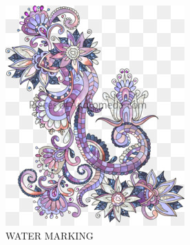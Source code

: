 \documentclass[12pt]{IEEEtran}
\begin{document}
\begin{subfigure}{\linewidth}
\includegraphics[width=\linewidth]{design}
\caption{WATER MARKING}
\end{subfigure}
\end{document}
